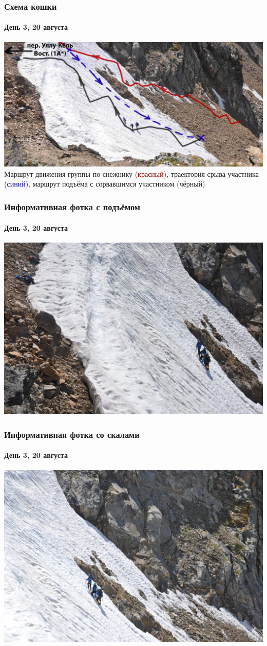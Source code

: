 \begin{frame}
	\frametitle{Схема кошки}
	\framesubtitle{День 3, 20 августа}
	\centering
	\includegraphics[width=\textwidth]{../pics/DSC_0946}			
	\footnotesize Маршрут движения группы по снежнику \textcolor{darkred}{(красный)}, траектория срыва участника \textcolor{darkblue}{(синий)}, маршрут подъёма с сорвавшимся участником (чёрный)
\end{frame}

\begin{frame}
	\frametitle{Информативная фотка с подъёмом}
	\framesubtitle{День 3, 20 августа}
	\centering
	\includegraphics[width=\textwidth]{../pics/DSC_0968}			
\end{frame}

\begin{frame}
	\frametitle{Информативная фотка со скалами}
	\framesubtitle{День 3, 20 августа}
	\centering
	\includegraphics[width=\textwidth]{../pics/DSC_0969}			
\end{frame}



